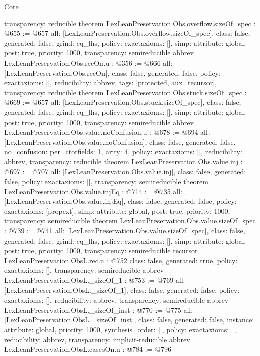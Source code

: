 \begin{lexlean}{Core}
\begin{coremodule}
{  transparency: reducible
}
theorem LexLeanPreservation.Obs.overflow.sizeOf_spec : @655 := @657 {
  all: [LexLeanPreservation.Obs.overflow.sizeOf_spec],
  class: false,
  generated: false,
  grind: eq_lhs,
  policy: exact{axioms: []},
  simp: {attribute: global, post: true, priority: 1000},
  transparency: semireducible
}
abbrev LexLeanPreservation.Obs.recOn.{u} : @356 := @666 {
  all: [LexLeanPreservation.Obs.recOn],
  class: false,
  generated: false,
  policy: exact{axioms: []},
  reducibility: abbrev{},
  tags: [protected, aux_recursor],
  transparency: reducible
}
theorem LexLeanPreservation.Obs.stuck.sizeOf_spec : @669 := @657 {
  all: [LexLeanPreservation.Obs.stuck.sizeOf_spec],
  class: false,
  generated: false,
  grind: eq_lhs,
  policy: exact{axioms: []},
  simp: {attribute: global, post: true, priority: 1000},
  transparency: semireducible
}
abbrev LexLeanPreservation.Obs.value.noConfusion.{u} : @678 := @694 {
  all: [LexLeanPreservation.Obs.value.noConfusion],
  class: false,
  generated: false,
  no_confusion: per_ctor{fields: 1, arity: 4},
  policy: exact{axioms: []},
  reducibility: abbrev{},
  transparency: reducible
}
theorem LexLeanPreservation.Obs.value.inj : @697 := @707 {
  all: [LexLeanPreservation.Obs.value.inj],
  class: false,
  generated: false,
  policy: exact{axioms: []},
  transparency: semireducible
}
theorem LexLeanPreservation.Obs.value.injEq : @714 := @735 {
  all: [LexLeanPreservation.Obs.value.injEq],
  class: false,
  generated: false,
  policy: exact{axioms: [propext]},
  simp: {attribute: global, post: true, priority: 1000},
  transparency: semireducible
}
theorem LexLeanPreservation.Obs.value.sizeOf_spec : @739 := @741 {
  all: [LexLeanPreservation.Obs.value.sizeOf_spec],
  class: false,
  generated: false,
  grind: eq_lhs,
  policy: exact{axioms: []},
  simp: {attribute: global, post: true, priority: 1000},
  transparency: semireducible
}
recursor LexLeanPreservation.ObsL.rec.{u} : @752 {
  class: false,
  generated: true,
  policy: exact{axioms: []},
  transparency: semireducible
}
abbrev LexLeanPreservation.ObsL._sizeOf_1 : @753 := @769 {
  all: [LexLeanPreservation.ObsL._sizeOf_1],
  class: false,
  generated: false,
  policy: exact{axioms: []},
  reducibility: abbrev{},
  transparency: semireducible
}
abbrev LexLeanPreservation.ObsL._sizeOf_inst : @770 := @775 {
  all: [LexLeanPreservation.ObsL._sizeOf_inst],
  class: false,
  generated: false,
  instance: {attribute: global, priority: 1000, synthesis_order: []},
  policy: exact{axioms: []},
  reducibility: abbrev{},
  transparency: implicit-reducible
}
abbrev LexLeanPreservation.ObsL.casesOn.{u} : @784 := @796 {
}
\end{coremodule}
\end{lexlean}
